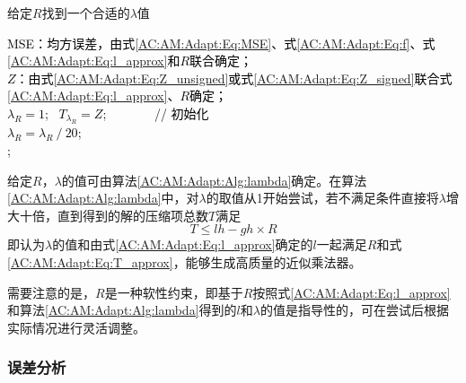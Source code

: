 \begin{algorithm}[!]
    \caption{给定$R$找到一个合适的$\lambda$值}
    \label{AC:AM:Adapt:Alg:lambda}
    \BlankLine
    \textcolor{black}{
      MSE：均方误差，由式\eqref{AC:AM:Adapt:Eq:MSE}、式\eqref{AC:AM:Adapt:Eq:f}、式\eqref{AC:AM:Adapt:Eq:l_approx}和$R$联合确定； \\
      $Z$：由式\eqref{AC:AM:Adapt:Eq:Z_unsigned}或式\eqref{AC:AM:Adapt:Eq:Z_signed}联合式\eqref{AC:AM:Adapt:Eq:l_approx}、$R$确定； \\
      $\lambda_R = 1$; \  $T_{\lambda_R} = Z$; \ \ \ \ \ \ \ // 初始化 \\
      \BlankLine
      $\lambda_R = \lambda_R \ / \ 20$; \\
      ;}
  \end{algorithm}

给定$R$，$\lambda$的值可由算法\ref{AC:AM:Adapt:Alg:lambda}确定。在算法\ref{AC:AM:Adapt:Alg:lambda}中，对$\lambda$的取值从1开始尝试，若不满足条件直接将$\lambda$增大十倍，直到得到的解的压缩项总数$T$满足
\begin{equation}
    T \le lh -gh \times R 
\end{equation}
即认为$\lambda$的值和由式\eqref{AC:AM:Adapt:Eq:l_approx}确定的$l$一起满足$R$和式\eqref{AC:AM:Adapt:Eq:T_approx}，能够生成高质量的近似乘法器。

需要注意的是，$R$是一种软性约束，即基于$R$按照式\eqref{AC:AM:Adapt:Eq:l_approx}和算法\ref{AC:AM:Adapt:Alg:lambda}得到的$l$和$\lambda$的值是指导性的，可在尝试后根据实际情况进行灵活调整。

\subsubsection{误差分析} \label{误差分析}

